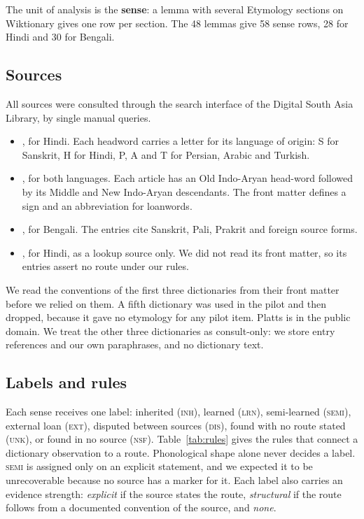 \documentclass[11pt]{article}
\newcommand{\lbl}[1]{\textsc{#1}}
\begin{document}
The unit of analysis is the \textbf{sense}: a lemma with several Etymology sections on Wiktionary gives one row per section. The 48 lemmas give 58 sense rows, 28 for Hindi and 30 for Bengali.

\subsection{Sources}

All sources were consulted through the search interface of the Digital South Asia Library, by single manual queries.
\begin{itemize}
\item \textbf{\citet{platts1884}}, for Hindi. Each headword carries a letter for its language of origin: S for Sanskrit, H for Hindi, P, A and T for Persian, Arabic and Turkish.
\item \textbf{\citet{turner1966cdial}}, for both languages. Each article has an Old Indo-Aryan head-word followed by its Middle and New Indo-Aryan descendants. The front matter defines a sign and an abbreviation for loanwords.
\item \textbf{\citet{dasa1937bangala}}, for Bengali. The entries cite Sanskrit, Pali, Prakrit and foreign source forms.
\item \textbf{\citet{dasa1975sabdasagara}}, for Hindi, as a lookup source only. We did not read its front matter, so its entries assert no route under our rules.
\end{itemize}
We read the conventions of the first three dictionaries from their front matter before we relied on them. A fifth dictionary was used in the pilot and then dropped, because it gave no etymology for any pilot item. Platts is in the public domain. We treat the other three dictionaries as consult-only: we store entry references and our own paraphrases, and no dictionary text.

\subsection{Labels and rules}

Each sense receives one label: inherited (\lbl{inh}), learned (\lbl{lrn}), semi-learned (\lbl{semi}), external loan (\lbl{ext}), disputed between sources (\lbl{dis}), found with no route stated (\lbl{unk}), or found in no source (\lbl{nsf}). Table~\ref{tab:rules} gives the rules that connect a dictionary observation to a route. Phonological shape alone never decides a label. \lbl{semi} is assigned only on an explicit statement, and we expected it to be unrecoverable because no source has a marker for it. Each label also carries an evidence strength: \textit{explicit} if the source states the route, \textit{structural} if the route follows from a documented convention of the source, and \textit{none}.
\end{document}
